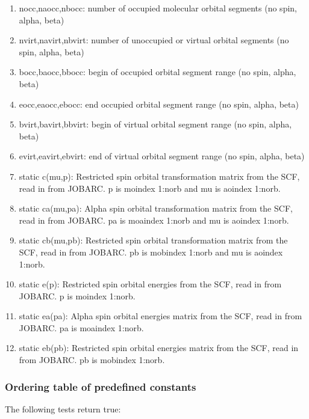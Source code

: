 \documentclass[12pt]{article}
\begin{document}
\begin{enumerate} 
\item nocc,naocc,nbocc: number of occupied molecular orbital 
segments (no spin, alpha, beta)
\item nvirt,navirt,nbvirt: number of unoccupied or virtual orbital segments 
(no spin, alpha, beta)
\item bocc,baocc,bbocc: begin of occupied orbital segment range (no spin, alpha, beta)
\item eocc,eaocc,ebocc: end occupied orbital segment range (no spin, alpha, beta) 
\item bvirt,bavirt,bbvirt: begin of virtual orbital segment range (no spin, alpha, beta)  
\item evirt,eavirt,ebvirt: end of virtual orbital segment range (no spin, alpha, beta) 
\item static c(mu,p): Restricted spin orbital transformation matrix from the SCF, read in from JOBARC. p is moindex 1:norb and mu is aoindex 1:norb.
\item static ca(mu,pa): Alpha spin orbital transformation matrix from the SCF, read in 
from JOBARC. pa is moaindex 1:norb and mu is aoindex 1:norb.
\item static cb(mu,pb): Restricted spin orbital transformation matrix from the SCF, read 
in from JOBARC. pb is mobindex 1:norb and mu is aoindex 1:norb.
\item static e(p): Restricted spin orbital energies from the SCF, read in from JOBARC. 
p is moindex 1:norb.
\item static ea(pa): Alpha spin orbital energies matrix from the SCF, read in from 
JOBARC. 
pa is moaindex 1:norb.
\item static eb(pb): Restricted spin orbital energies matrix from the SCF, read in 
from JOBARC. pb is mobindex 1:norb.
\end{enumerate} 

\subsubsection{Ordering table of predefined constants} 

The following tests return true:
\end{document}
